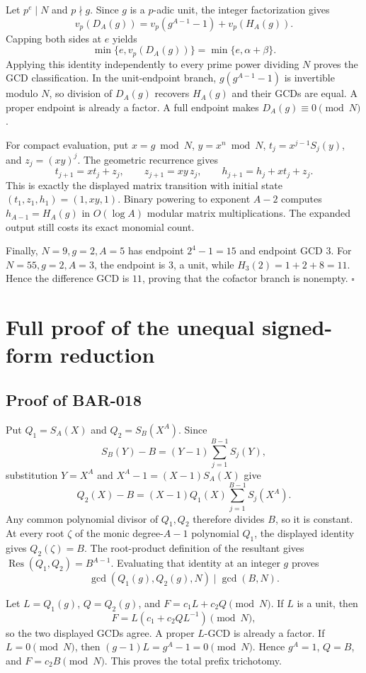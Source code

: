 \documentclass[11pt]{article}
\begin{document}
Let \(p^e\mid N\) and \(p\nmid g\). Since \(g\) is a \(p\)-adic unit, the
integer factorization gives
\[
v_p(D_A(g))
=v_p(g^{A-1}-1)+v_p(H_A(g)).
\]
Capping both sides at \(e\) yields
\[
\min\{e,v_p(D_A(g))\}=\min\{e,\alpha+\beta\}.
\]
Applying this identity independently to every prime power dividing \(N\)
proves the GCD classification. In the unit-endpoint branch,
\(g(g^{A-1}-1)\) is invertible modulo \(N\), so division of \(D_A(g)\)
recovers \(H_A(g)\) and their GCDs are equal. A proper endpoint is already
a factor. A full endpoint makes \(D_A(g)\equiv0\pmod N\).

For compact evaluation, put \(x=g\bmod N\), \(y=x^n\bmod N\),
\(t_j=x^{j-1}S_j(y)\), and \(z_j=(xy)^j\). The geometric recurrence gives
\[
t_{j+1}=xt_j+z_j,\qquad
z_{j+1}=xy\,z_j,\qquad
h_{j+1}=h_j+xt_j+z_j.
\]
This is exactly the displayed matrix transition with initial state
\((t_1,z_1,h_1)=(1,xy,1)\). Binary powering to exponent \(A-2\) computes
\(h_{A-1}=H_A(g)\) in \(O(\log A)\) modular matrix multiplications. The
expanded output still costs its exact monomial count.

Finally, \(N=9,g=2,A=5\) has endpoint \(2^4-1=15\) and endpoint GCD \(3\).
For \(N=55,g=2,A=3\), the endpoint is \(3\), a unit, while
\(H_3(2)=1+2+8=11\). Hence the difference GCD is \(11\), proving that the
cofactor branch is nonempty. \(\square\)

\section{Full proof of the unequal signed-form reduction}

\subsection{Proof of BAR-018}\label{proof:BAR-018}

Put \(Q_1=S_A(X)\) and \(Q_2=S_B(X^A)\). Since
\[
S_B(Y)-B=(Y-1)\sum_{j=1}^{B-1}S_j(Y),
\]
substitution \(Y=X^A\) and \(X^A-1=(X-1)S_A(X)\) give
\[
Q_2(X)-B=(X-1)Q_1(X)\sum_{j=1}^{B-1}S_j(X^A).
\]
Any common polynomial divisor of \(Q_1,Q_2\) therefore divides \(B\), so it
is constant. At every root \(\zeta\) of the monic degree-\(A-1\) polynomial
\(Q_1\), the displayed identity gives \(Q_2(\zeta)=B\). The root-product definition
of the resultant gives
\(\operatorname{Res}(Q_1,Q_2)=B^{A-1}\). Evaluating that identity at an integer
\(g\) proves
\[
\gcd(Q_1(g),Q_2(g),N)\mid\gcd(B,N).
\]

Let \(L=Q_1(g)\), \(Q=Q_2(g)\), and
\(F=c_1L+c_2Q\pmod N\). If \(L\) is a unit, then
\[
F=L(c_1+c_2QL^{-1})\pmod N,
\]
so the two displayed GCDs agree. A proper \(L\)-GCD is already a factor.
If \(L=0\pmod N\), then
\((g-1)L=g^A-1=0\pmod N\). Hence \(g^A=1\), \(Q=B\), and
\(F=c_2B\pmod N\). This proves the total prefix trichotomy.
\end{document}
